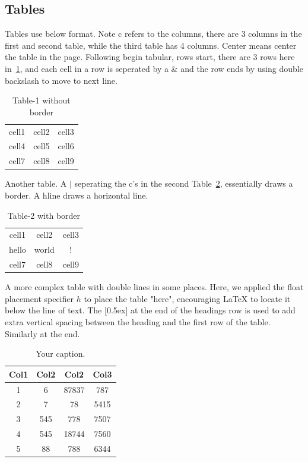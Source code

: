 \subsection{Tables}
Tables use below format. Note c refers to the columns, there are 3 columns in the first and second table, while the third table has 4 columns. Center means center the table in the page.  Following begin tabular, rows start, there are 3 rows here in~\ref{tab-1}, and each cell in a row is seperated by a \& and the row ends by using double backslash to move to next line.

\begin{table}[!h]
\begin{center}
\begin{tabular}{c c c}
 cell1 & cell2 & cell3 \\
 cell4 & cell5 & cell6 \\  
 cell7 & cell8 & cell9
\end{tabular}
\caption{Table-1 without border}
\label{tab-1}
\end{center}
\end{table}

Another table. A $|$ seperating the c's in the second Table~\ref{tab-2}, essentially draws a border. A hline draws a horizontal line.

\begin{table}[!h]
\begin{center}
\begin{tabular}{|c|c|c|}
 \hline
 cell1 & cell2 & cell3 \\
 hello & world & ! \\
 cell7 & cell8 & cell9 \\
 \hline
\end{tabular}
\caption{Table-2 with border}
\label{tab-2}
\end{center}
\end{table}

A more complex table with double lines in some places. Here, we applied the float placement specifier $\!h$ to place the table "here", encouraging LaTeX to locate it below the line of text. The [0.5ex] at the end of the headings row is used to add extra vertical spacing between the heading and the first row of the table. Similarly at the end.

\begin{table}[!h]
\begin{center}
\begin{tabular}{||c c c c||} 
 \hline
 Col1 & Col2 & Col2 & Col3 \\ [0.5ex] 
 \hline\hline
 1 & 6 & 87837 & 787 \\ 
 \hline
 2 & 7 & 78 & 5415 \\
 \hline
 3 & 545 & 778 & 7507 \\
 \hline
 4 & 545 & 18744 & 7560 \\
 \hline
 5 & 88 & 788 & 6344 \\ [1ex] 
 \hline
\end{tabular}
\caption{\label{demo-table}Your caption.}
\end{center}
\end{table}



